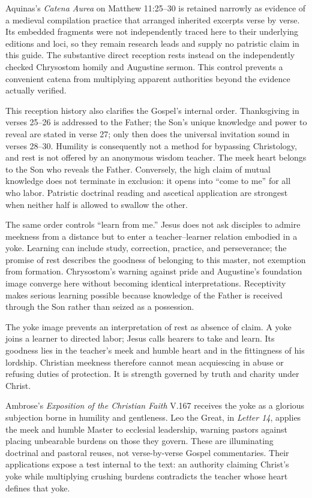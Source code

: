 \begin{deepstudy}
Aquinas's \emph{Catena Aurea} on Matthew 11:25--30 is retained narrowly as evidence of a medieval compilation practice that arranged inherited excerpts verse by verse. Its embedded fragments were not independently traced here to their underlying editions and loci, so they remain research leads and supply no patristic claim in this guide. The substantive direct reception rests instead on the independently checked Chrysostom homily and Augustine sermon. This control prevents a convenient catena from multiplying apparent authorities beyond the evidence actually verified.

This reception history also clarifies the Gospel's internal order. Thanksgiving in verses 25--26 is addressed to the Father; the Son's unique knowledge and power to reveal are stated in verse 27; only then does the universal invitation sound in verses 28--30. Humility is consequently not a method for bypassing Christology, and rest is not offered by an anonymous wisdom teacher. The meek heart belongs to the Son who reveals the Father. Conversely, the high claim of mutual knowledge does not terminate in exclusion: it opens into “come to me” for all who labor. Patristic doctrinal reading and ascetical application are strongest when neither half is allowed to swallow the other.

The same order controls “learn from me.” Jesus does not ask disciples to admire meekness from a distance but to enter a teacher--learner relation embodied in a yoke. Learning can include study, correction, practice, and perseverance; the promise of rest describes the goodness of belonging to this master, not exemption from formation. Chrysostom's warning against pride and Augustine's foundation image converge here without becoming identical interpretations. Receptivity makes serious learning possible because knowledge of the Father is received through the Son rather than seized as a possession.

The yoke image prevents an interpretation of rest as absence of claim. A yoke joins a learner to directed labor; Jesus calls hearers to take and learn. Its goodness lies in the teacher's meek and humble heart and in the fittingness of his lordship. Christian meekness therefore cannot mean acquiescing in abuse or refusing duties of protection. It is strength governed by truth and charity under Christ.

Ambrose's \emph{Exposition of the Christian Faith} V.167 receives the yoke as a glorious subjection borne in humility and gentleness. Leo the Great, in \emph{Letter 14}, applies the meek and humble Master to ecclesial leadership, warning pastors against placing unbearable burdens on those they govern. These are illuminating doctrinal and pastoral reuses, not verse-by-verse Gospel commentaries. Their applications expose a test internal to the text: an authority claiming Christ's yoke while multiplying crushing burdens contradicts the teacher whose heart defines that yoke.


\end{deepstudy}

